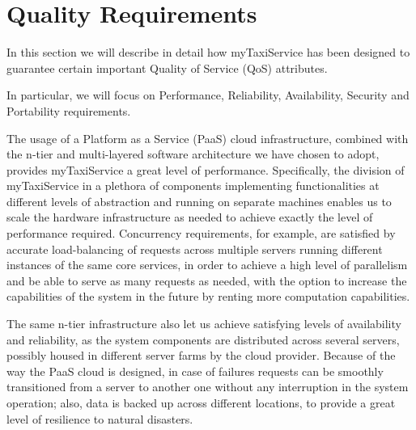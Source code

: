 \section{Quality Requirements}

In this section we will describe in detail how myTaxiService has been designed to guarantee certain important Quality of Service (QoS) attributes.

In particular, we will focus on Performance, Reliability, Availability, Security and Portability requirements.

The usage of a Platform as a Service (PaaS) cloud infrastructure, combined with the n-tier and multi-layered software architecture we have chosen to adopt, provides myTaxiService a great level of performance. Specifically, the division of myTaxiService in a plethora of components implementing functionalities at different levels of abstraction and running on separate machines enables us to scale the hardware infrastructure as needed to achieve exactly the level of performance required. Concurrency requirements, for example, are satisfied by accurate load-balancing of requests across multiple servers running different instances of the same core services, in order to achieve a high level of parallelism and be able to serve as many requests as needed, with the option to increase the capabilities of the system in the future by renting more computation capabilities. 

The same n-tier infrastructure also let us achieve satisfying levels of availability and reliability, as the system components are distributed across several servers, possibly housed in different server farms by the cloud provider. Because of the way the PaaS cloud is designed, in case of failures requests can be smoothly transitioned from a server to another one without any interruption in the system operation; also, data is backed up across different locations, to provide a great level of resilience to natural disasters.

